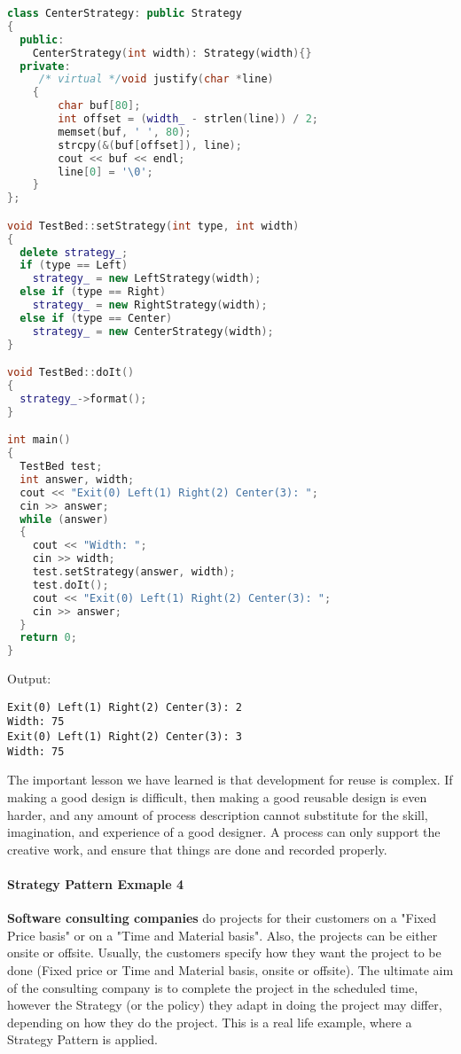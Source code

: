 \documentclass{book}
\begin{document}
\begin{lstlisting}[caption={Strategy Pattern Sample 3}, language=C++]
class CenterStrategy: public Strategy
{
  public:
    CenterStrategy(int width): Strategy(width){}
  private:
     /* virtual */void justify(char *line)
    {
        char buf[80];
        int offset = (width_ - strlen(line)) / 2;
        memset(buf, ' ', 80);
        strcpy(&(buf[offset]), line);
        cout << buf << endl;
        line[0] = '\0';
    }
};

void TestBed::setStrategy(int type, int width)
{
  delete strategy_;
  if (type == Left)
    strategy_ = new LeftStrategy(width);
  else if (type == Right)
    strategy_ = new RightStrategy(width);
  else if (type == Center)
    strategy_ = new CenterStrategy(width);
}

void TestBed::doIt()
{
  strategy_->format();
}

int main()
{
  TestBed test;
  int answer, width;
  cout << "Exit(0) Left(1) Right(2) Center(3): ";
  cin >> answer;
  while (answer)
  {
    cout << "Width: ";
    cin >> width;
    test.setStrategy(answer, width);
    test.doIt();
    cout << "Exit(0) Left(1) Right(2) Center(3): ";
    cin >> answer;
  }
  return 0;
}
\end{lstlisting}
Output:
\begin{verbatim}
Exit(0) Left(1) Right(2) Center(3): 2
Width: 75
Exit(0) Left(1) Right(2) Center(3): 3
Width: 75
\end{verbatim}

The important lesson we have learned is that development for reuse is complex.
If making a good design is difficult, then making a good reusable design is even harder, and any amount of process description cannot substitute for the skill,
imagination, and experience of a good designer. A process can only support the creative work, and ensure that things are done and recorded properly.
\paragraph{Strategy Pattern Exmaple 4}
\textbf{Software consulting companies} do projects for their customers on a "Fixed Price basis" or on a "Time and Material basis".
Also, the projects can be either onsite or offsite. Usually, the customers specify how they want the project to be done (Fixed price or Time and Material basis, onsite or offsite).
The ultimate aim of the consulting company is to complete the project in the scheduled time, however the Strategy (or the policy) they adapt in doing the project may differ,
depending on how they do the project. This is a real life example, where a Strategy Pattern is applied. 
\end{document}

